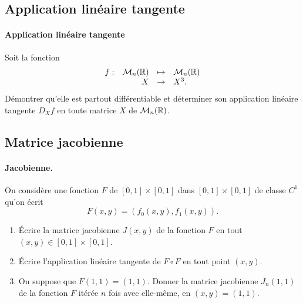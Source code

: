 \subsection{Application linéaire tangente}

\paragraph{Application linéaire tangente}
Soit la fonction
$$
\begin{array}{rrcl}
  f :  & \mathcal{M}_n(\mathbb{R}) & \mapsto & \mathcal{M}_n(\mathbb{R}) \\
  & X & \rightarrow & X^3.
\end{array}
$$
Démontrer qu'elle est partout différentiable et déterminer son application linéaire tangente $D_X f$ en toute matrice $X$ de $\mathcal{M}_n(\mathbb{R})$.

\subsection{Matrice jacobienne}

\paragraph{Jacobienne.}
On considère une fonction $F$ de $[0, 1] \times [0, 1]$ dans $[0, 1] \times [0, 1]$ de classe $C^1$ qu'on écrit
$$
F(x, y) = (f_0(x, y), f_1(x, y)).
$$
\begin{enumerate}
  \item \'Ecrire la matrice jacobienne $J(x, y)$ de la fonction $F$ en tout $(x, y) \in [0, 1] \times [0, 1]$.
  \solution{\todo{}}
  \item \'Ecrire l'application linéaire tangente de $F \circ F$ en tout point $(x, y)$.
  \solution{\todo{}}
  \item On suppose que $F(1, 1) = (1, 1)$. Donner la matrice jacobienne $J_n(1, 1)$ de la fonction $F$ itérée $n$ fois avec elle-même, en $(x, y) = (1, 1)$.
  \solution{\todo{}}
\end{enumerate}

